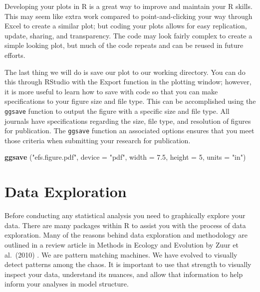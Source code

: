 \documentclass[
]{book}
\newenvironment{Shaded}{\begin{snugshade}}{\end{snugshade}}
\newcommand{\AttributeTok}[1]{\textcolor[rgb]{0.13,0.29,0.53}{#1}}
\newcommand{\DecValTok}[1]{\textcolor[rgb]{0.00,0.00,0.81}{#1}}
\newcommand{\FloatTok}[1]{\textcolor[rgb]{0.00,0.00,0.81}{#1}}
\newcommand{\FunctionTok}[1]{\textcolor[rgb]{0.13,0.29,0.53}{\textbf{#1}}}
\newcommand{\NormalTok}[1]{#1}
\newcommand{\StringTok}[1]{\textcolor[rgb]{0.31,0.60,0.02}{#1}}
\begin{document}
Developing your plots in R is a great way to improve and maintain your R skills. This may seem like extra work compared to point-and-clicking your way through Excel to create a similar plot; but coding your plots allows for easy replication, update, sharing, and transparency. The code may look fairly complex to create a simple looking plot, but much of the code repeats and can be reused in future efforts.

The last thing we will do is save our plot to our working directory. You can do this through RStudio with the Export function in the plotting window; however, it is more useful to learn how to save with code so that you can make specifications to your figure size and file type. This can be accomplished using the \texttt{ggsave} function to output the figure with a specific size and file type. All journals have specifications regarding the size, file type, and resolution of figures for publication. The \texttt{ggsave} function an associated options ensures that you meet those criteria when submitting your research for publication.

\begin{Shaded}
\begin{Highlighting}[]
\FunctionTok{ggsave}\NormalTok{ (}\StringTok{"efs.figure.pdf"}\NormalTok{, }\AttributeTok{device =} \StringTok{"pdf"}\NormalTok{, }\AttributeTok{width =} \FloatTok{7.5}\NormalTok{, }\AttributeTok{height =} \DecValTok{5}\NormalTok{, }\AttributeTok{units =} \StringTok{"in"}\NormalTok{)}
\end{Highlighting}
\end{Shaded}

\hypertarget{data-exploration}{%
\chapter{Data Exploration}\label{data-exploration}}

Before conducting any statistical analysis you need to graphically explore your data. There are many packages within R to assist you with the process of data exploration. Many of the reasons behind data exploration and methodology are outlined in a review article in Methods in Ecology and Evolution by Zuur et al.~(2010) . We are pattern matching machines. We have evolved to visually detect patterns among the chaos. It is important to use that strength to visually inspect your data, understand its nuances, and allow that information to help inform your analyses in model structure.
\end{document}
